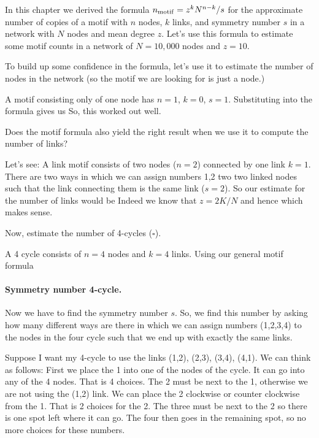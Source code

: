 In this chapter we derived the formula $n_{\rm motif} = z^k N^{n-k}/s$ for the approximate number of copies of a motif with 
$n$ nodes, $k$ links, and symmetry number $s$ in a network with $N$ nodes and mean degree $z$. Let's use this formula to estimate some motif counts in a network of $N=10,000$ nodes and $z=10$. 

\subquestion 
To build up some confidence in the formula, let's use it to estimate the number of nodes in the network (so the motif we are looking for is just a node.)

\solution
A motif consisting only of one node has $n=1$, $k=0$, $s=1$. Substituting into the formula gives us
So, this worked out well. 

\subquestion 
Does the motif formula also yield the right result when we use it to compute the number of links?

\solution
Let's see: A link motif consists of two nodes ($n=2$) connected by one link $k=1$. There are two ways in which we can assign numbers 1,2 two two linked nodes such that the link connecting them is the same link ($s=2$). So our estimate for the number of links would be 
Indeed we know that $z=2K/N$ and hence 
which makes sense.

\subquestion
Now, estimate the number of 4-cycles ($\square$).

\solution
A 4 cycle consists of $n=4$ nodes and $k=4$ links. 
Using our general motif formula
\paragraph{Symmetry number 4-cycle.}Now we have to find the symmetry number $s$. So, we find this number by asking how many different ways are there in which we can assign numbers (1,2,3,4) to the nodes in the four cycle such that we end up with exactly the same links. 

Suppose I want my 4-cycle to use the links (1,2), (2,3), (3,4), (4,1). We can think as follows: First we place the 1 into one of the nodes of the cycle. It can go into any of the 4 nodes. That is 4 choices. The 2 must be next to the 1, otherwise we are not using the (1,2) link. We can place the 2 clockwise or counter clockwise from the 1. That is 2 choices for the 2. The three must be next to the 2 so there is one spot left where it can go. The four then goes in the remaining spot, so no more choices for these numbers. 

